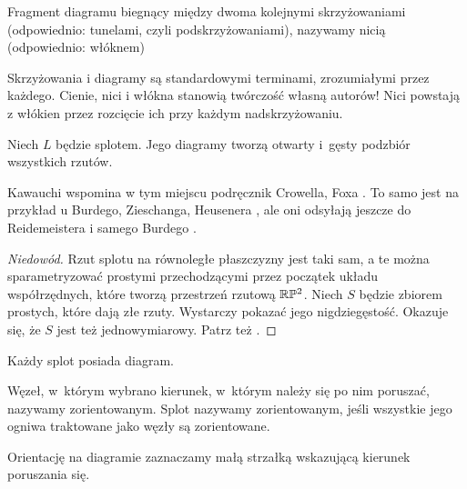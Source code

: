 \begin{definition}
%
%
    Fragment diagramu biegnący między dwoma kolejnymi skrzyżowaniami (odpowiednio: tunelami, czyli podskrzyżowaniami), nazywamy nicią (odpowiednio: włóknem)
\end{definition}

Skrzyżowania i diagramy są standardowymi terminami, zrozumiałymi przez każdego. 
Cienie, nici i włókna stanowią twórczość własną autorów!
Nici powstają z włókien przez rozcięcie ich przy każdym nadskrzyżowaniu.

\begin{proposition}
\label{prp:links_have_diagrams}%
    Niech $L$ będzie splotem.
    Jego diagramy tworzą otwarty i~gęsty podzbiór wszystkich rzutów.
\end{proposition}

Kawauchi \cite[s. 7]{kawauchi1996} wspomina w tym miejscu podręcznik Crowella, Foxa \cite[s. 7]{crowell1963}.
To samo jest na przykład u Burdego, Zieschanga, Heusenera \cite[s. 10]{burde2014}, ale oni odsyłają jeszcze do Reidemeistera \cite{reidemeister1927} i samego Burdego \cite{burde1978}.

\begin{proof}[Niedowód]
    Rzut splotu na równoległe płaszczyzny jest taki sam, a te można sparametryzować prostymi przechodzącymi przez początek układu współrzędnych, które tworzą przestrzeń rzutową $\mathbb R \mathbb P^2$.
    Niech $S$ będzie zbiorem prostych, które dają złe rzuty.
    Wystarczy pokazać jego nigdziegęstość.
    Okazuje się, że $S$ jest też jednowymiarowy.
    Patrz też \cite[s. 12]{przytycki1995}.
\end{proof}

\begin{corollary}
    Każdy splot posiada diagram.
\end{corollary}

\begin{definition}[orientacja]
%
%
    Węzeł, w~którym wybrano kierunek, w~którym należy się po nim poruszać, nazywamy zorientowanym.
    Splot nazywamy zorientowanym, jeśli wszystkie jego ogniwa traktowane jako węzły są zorientowane.
\end{definition}

Orientację na diagramie zaznaczamy małą strzałką wskazującą kierunek poruszania się.











